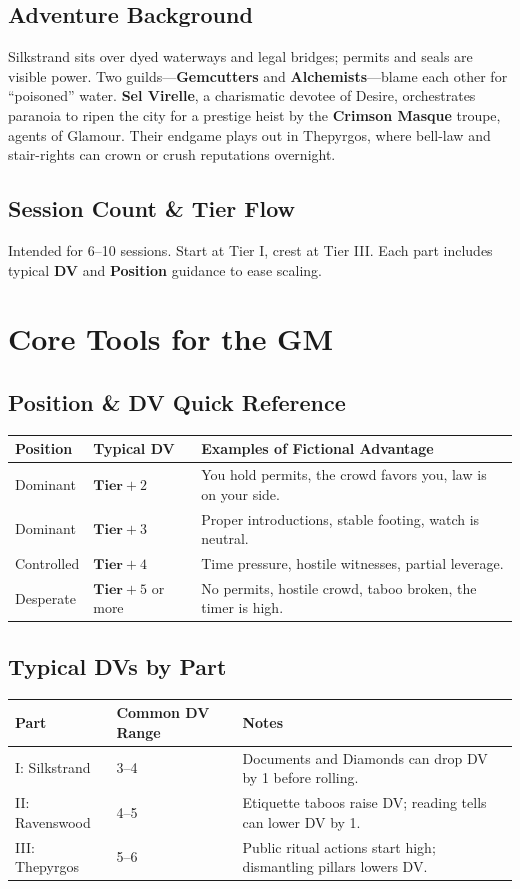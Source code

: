 \documentclass[11pt]{article}
\newcommand{\Term}[1]{\textbf{#1}}
\newcommand{\DV}{\Term{DV}}
\newcommand{\Position}{\Term{Position}}
\newcommand{\Tier}{\Term{Tier}}
\begin{document}
\subsection*{Adventure Background}
Silkstrand sits over dyed waterways and legal bridges; permits and seals are visible power. Two guilds---\textbf{Gemcutters} and \textbf{Alchemists}---blame each other for ``poisoned'' water. \textbf{Sel Virelle}, a charismatic devotee of Desire, orchestrates paranoia to ripen the city for a prestige heist by the \textbf{Crimson Masque} troupe, agents of Glamour. Their endgame plays out in Thepyrgos, where bell-law and stair-rights can crown or crush reputations overnight.

\subsection*{Session Count \& Tier Flow}
Intended for 6--10 sessions. Start at Tier I, crest at Tier III. Each part includes typical \DV{} and \Position{} guidance to ease scaling.

\section*{Core Tools for the GM}

\subsection*{Position \& DV Quick Reference}
\vspace{-0.5em}
\begin{tabularx}{\linewidth}{@{}l l X@{}}
\toprule
\textbf{Position} & \textbf{Typical DV} & \textbf{Examples of Fictional Advantage}\\
\midrule
Dominant & \(\Tier+2\) & You hold permits, the crowd favors you, law is on your side.\\
Dominant & \(\Tier+3\) & Proper introductions, stable footing, watch is neutral.\\
Controlled & \(\Tier+4\) & Time pressure, hostile witnesses, partial leverage.\\
Desperate & \(\Tier+5\) or more & No permits, hostile crowd, taboo broken, the timer is high.\\
\bottomrule
\end{tabularx}

\subsection*{Typical DVs by Part}
\begin{tabularx}{\linewidth}{@{}l l X@{}}
\toprule
\textbf{Part} & \textbf{Common DV Range} & \textbf{Notes}\\
\midrule
I: Silkstrand & 3--4 & Documents and Diamonds can drop DV by 1 before rolling.\\
II: Ravenswood & 4--5 & Etiquette taboos raise DV; reading tells can lower DV by 1.\\
III: Thepyrgos & 5--6 & Public ritual actions start high; dismantling pillars lowers DV.\\
\bottomrule
\end{tabularx}
\end{document}
